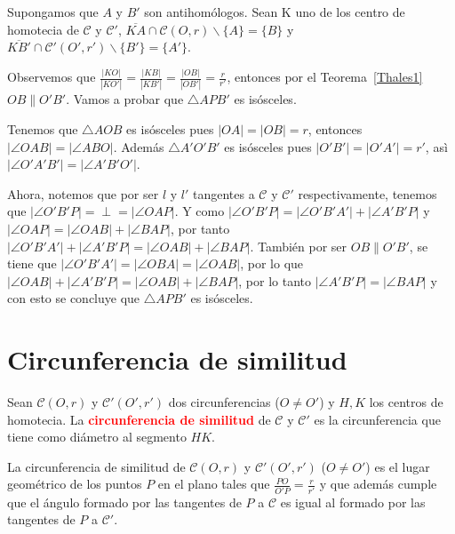 \begin{itemize}
\begin{pba}
Supongamos que $A$ y $B'$ son antihomólogos. Sean K uno de los centro de homotecia de $\mathcal{C}$ y $\mathcal{C'}$, $\overline{KA}\cap\mathcal{C}(O,r)\backslash\{A\}=\{B\}$ y $\overline{KB'}\cap\mathcal{C'}(O',r')\backslash\{B'\}=\{A'\}$.

Observemos que $\frac{|KO|}{|KO'|}=\frac{|KB|}{|KB'|}=\frac{|OB|}{|OB'|}=\frac{r}{r'}$, entonces por el Teorema~\ref{Thales1} $OB\parallel O'B'$. Vamos a probar que  $\triangle APB'$ es isósceles. 

Tenemos que $\triangle AOB$ es isósceles pues $|OA|=|OB|=r$, entonces $|\angle OAB|=|\angle ABO|$. Además $\triangle A'O'B'$ es isósceles pues $|O'B'|=|O'A'|=r'$, asì $|\angle O'A'B'|=|\angle A'B'O'|$.

Ahora, notemos que por ser $l$ y $l'$ tangentes a $\mathcal{C}$ y $\mathcal{C'}$ respectivamente, tenemos que $|\angle O'B'P|=\perp=|\angle OAP|$. Y como $|\angle O'B'P|=|\angle O'B'A'|+|\angle A'B'P|$ y $|\angle OAP|=|\angle OAB|+|\angle BAP|$, por tanto $|\angle O'B'A'|+|\angle A'B'P|=|\angle OAB|+|\angle BAP|$. También por ser $OB\parallel O'B'$, se tiene que $|\angle O'B'A'|= |\angle OBA|=|\angle OAB|$, por lo que $|\angle OAB|+|\angle A'B'P|=|\angle OAB|+|\angle BAP|$, por lo tanto $|\angle A'B'P|=|\angle BAP|$ y con esto se concluye que $\triangle APB'$ es isósceles. 
\end{pba}
\end{itemize}

\section{Circunferencia de similitud}
\begin{df}
Sean $\mathcal{C}(O,r)$ y $\mathcal{C'}(O',r')$ dos circunferencias ($O\neq O'$) y $H,K$ los centros de homotecia. La \textcolor{red}{\bf circunferencia de similitud} de $\mathcal{C}$ y $\mathcal{C'}$ es la circunferencia que tiene como diámetro al segmento $HK$.
\end{df}

\begin{teo}\label{CDS}
La circunferencia de similitud de $\mathcal{C}(O,r)$ y $\mathcal{C'}(O',r')$ ($O\neq O'$) es el lugar geométrico de los puntos $P$ en el plano tales que $\frac{PO}{O'P}=\frac{r}{r'}$ y que además cumple que el ángulo formado por las tangentes de $P$ a $\mathcal{C}$ es igual al formado por las tangentes de $P$ a $\mathcal{C'}$.
\end{teo}

